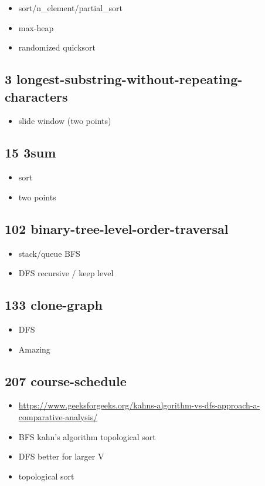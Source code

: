 \begin{itemize}
	\item sort/n\_element/partial\_sort
	\item max-heap
	\item randomized quicksort
\end{itemize}

\subsection{3 longest-substring-without-repeating-characters}

\begin{itemize}
	\item slide window (two points)
\end{itemize}

\subsection{15 3sum}

\begin{itemize}
	\item sort
	\item two points
\end{itemize}

\subsection{102 binary-tree-level-order-traversal}

\begin{itemize}
	\item stack/queue BFS
	\item DFS recursive / keep level
\end{itemize}

\subsection{133 clone-graph}

\begin{itemize}
	\item DFS
	\item Amazing
\end{itemize}

\subsection{207 course-schedule}

\begin{itemize}
	\item \url{https://www.geeksforgeeks.org/kahns-algorithm-vs-dfs-approach-a-comparative-analysis/}
	\item BFS kahn's algorithm topological sort
	\item DFS better for larger V
	\item topological sort
\end{itemize}


